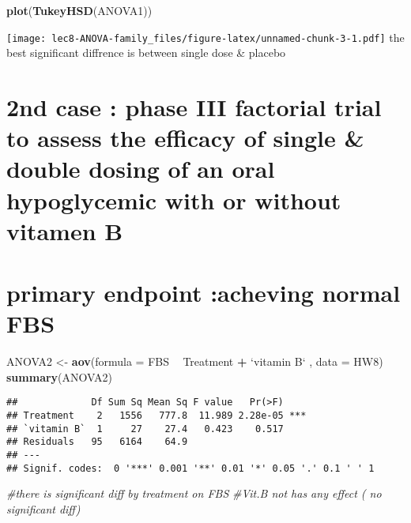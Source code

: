 \documentclass[]{article}
\newenvironment{Shaded}{\begin{snugshade}}{\end{snugshade}}
\newcommand{\KeywordTok}[1]{\textcolor[rgb]{0.13,0.29,0.53}{\textbf{#1}}}
\newcommand{\DataTypeTok}[1]{\textcolor[rgb]{0.13,0.29,0.53}{#1}}
\newcommand{\StringTok}[1]{\textcolor[rgb]{0.31,0.60,0.02}{#1}}
\newcommand{\CommentTok}[1]{\textcolor[rgb]{0.56,0.35,0.01}{\textit{#1}}}
\newcommand{\OperatorTok}[1]{\textcolor[rgb]{0.81,0.36,0.00}{\textbf{#1}}}
\newcommand{\NormalTok}[1]{#1}
\begin{document}
\begin{Shaded}
\begin{Highlighting}[]
\KeywordTok{plot}\NormalTok{(}\KeywordTok{TukeyHSD}\NormalTok{(ANOVA1))}
\end{Highlighting}
\end{Shaded}

\texttt{[image: lec8-ANOVA-family\_files/figure-latex/unnamed-chunk-3-1.pdf]}
the best significant diffrence is between single dose \& placebo

\section{2nd case : phase III factorial trial to assess the efficacy of
single \& double dosing of an oral hypoglycemic with or without vitamen
B}\label{nd-case-phase-iii-factorial-trial-to-assess-the-efficacy-of-single-double-dosing-of-an-oral-hypoglycemic-with-or-without-vitamen-b}

\section{primary endpoint :acheving normal
FBS}\label{primary-endpoint-acheving-normal-fbs-1}

\begin{Shaded}
\begin{Highlighting}[]
\NormalTok{ANOVA2 <-}\StringTok{ }\KeywordTok{aov}\NormalTok{(}\DataTypeTok{formula =}\NormalTok{ FBS }\OperatorTok{~}\StringTok{ }\NormalTok{Treatment }\OperatorTok{+}\StringTok{ `}\DataTypeTok{vitamin B}\StringTok{`}\NormalTok{ , }\DataTypeTok{data =}\NormalTok{ HW8) }
\KeywordTok{summary}\NormalTok{(ANOVA2)}
\end{Highlighting}
\end{Shaded}

\begin{verbatim}
##             Df Sum Sq Mean Sq F value   Pr(>F)    
## Treatment    2   1556   777.8  11.989 2.28e-05 ***
## `vitamin B`  1     27    27.4   0.423    0.517    
## Residuals   95   6164    64.9                     
## ---
## Signif. codes:  0 '***' 0.001 '**' 0.01 '*' 0.05 '.' 0.1 ' ' 1
\end{verbatim}

\begin{Shaded}
\begin{Highlighting}[]
\CommentTok{#there is significant diff by treatment on FBS  }
\CommentTok{#Vit.B  not  has any effect ( no significant diff)}
\end{Highlighting}
\end{Shaded}
\end{document}
